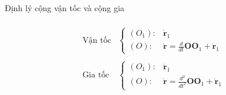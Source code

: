 \begin{frame}{Định lý cộng vận tốc và cộng gia}
\begin{center}
\begin{minipage}{0.45\linewidth}
\begin{equation*}
\begin{array}{cl}
                \\
                \text{Vận tốc} &\left\{
                \begin{array}{cl}
                (O_1): &\dot{\mathbf{r}}_1 \\
                (O): &\dot{\mathbf{r}} = \displaystyle \frac{d}{dt}\mathbf{OO}_1 + \dot{\mathbf{r}}_1
                \end{array}
                \right.
                \\
                \\
                \text{Gia tốc} &\left\{
                \begin{array}{cl}
                (O_1): &\ddot{\mathbf{r}}_1 \\
                (O): &\ddot{\mathbf{r}} =\displaystyle \frac{d^2}{dt^2} \mathbf{OO}_1 + \ddot{\mathbf{r}}_1
                \end{array}
                \right.
                \end{array}
        \end{equation*}
        \end{minipage}
    \end{center}
\end{frame}
